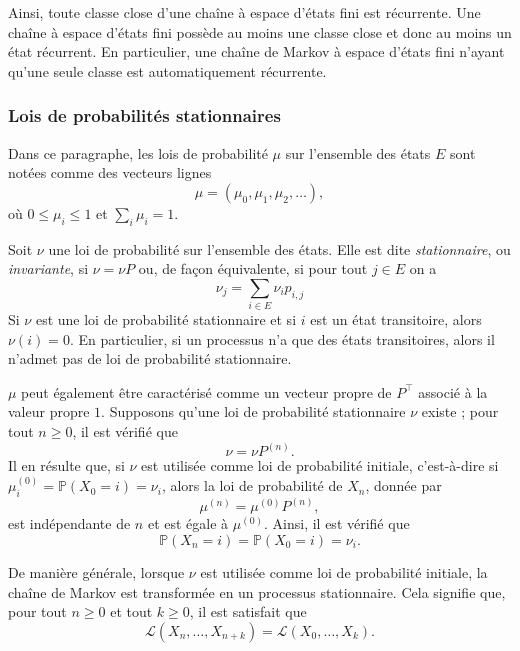 \begin{sloppypar}
Ainsi, toute classe close d'une chaîne à espace d’états fini est récurrente. Une chaîne à espace d’états fini possède au moins une classe close et donc au moins un état récurrent. En particulier, une chaîne de Markov à espace d’états fini n’ayant qu’une seule classe est automatiquement récurrente.

\subsubsection{Lois de probabilités stationnaires}

Dans ce paragraphe, les lois de probabilité $\mu$ sur l’ensemble des états $E$ sont notées comme des vecteurs lignes 
\[
\mu = (\mu_0, \mu_1, \mu_2, \dots),
\]
où $0 \leq \mu_i \leq 1$ et $\sum_i \mu_i = 1$.

\begin{tcolorbox}[colback=blue!5!white,colframe=blue!75!black,title=Définition]
    Soit $\nu$ une loi de probabilité sur l’ensemble des états. Elle est dite \textit{stationnaire}, ou \textit{invariante}, si $\nu = \nu P$ ou, de façon équivalente, si pour tout $j \in E$ on a
    \begin{equation}
        \nu_j = \sum_{i \in E} \nu_i p_{i,j}
    \end{equation}
    Si $\nu$ est une loi de probabilité stationnaire et si $i$ est un état transitoire, alors $\nu(i) = 0$. En particulier, si un processus n’a que des états transitoires, alors il n’admet pas de loi de probabilité stationnaire.
    \end{tcolorbox}

$\mu$ peut également être caractérisé comme un vecteur propre de $P^\top$ associé à la valeur propre $1$. Supposons qu'une loi de probabilité stationnaire $\nu$ existe ; pour tout $n \geq 0$, il est vérifié que 
\[
\nu = \nu P^{(n)}.
\]
Il en résulte que, si $\nu$ est utilisée comme loi de probabilité initiale, c’est-à-dire si $\mu^{(0)}_i = \mathbb{P}(X_0 = i) = \nu_i$, alors la loi de probabilité de $X_n$, donnée par 
\[
\mu^{(n)} = \mu^{(0)} P^{(n)},
\]
est indépendante de $n$ et est égale à $\mu^{(0)}$. Ainsi, il est vérifié que 
\[
\mathbb{P}(X_n = i) = \mathbb{P}(X_0 = i) = \nu_i.
\]

De manière générale, lorsque $\nu$ est utilisée comme loi de probabilité initiale, la chaîne de Markov est transformée en un processus stationnaire. Cela signifie que, pour tout $n \geq 0$ et tout $k \geq 0$, il est satisfait que 
\[
\mathcal{L}(X_n, \dots, X_{n+k}) = \mathcal{L}(X_0, \dots, X_k).
\]


\end{sloppypar}
